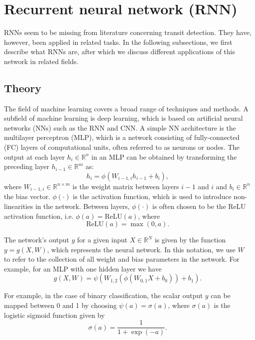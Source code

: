 
\section{Recurrent neural network (RNN)}
\label{sec:rnn}

RNNs seem to be missing from literature concerning transit detection. They have, however, been applied in related tasks. In the following subsections, we first describe what RNNs are, after which we discuss different applications of this network in related fields.

\subsection{Theory}

\noindent The field of machine learning covers a broad range of techniques and methods. A subfield of machine learning is deep learning, which is based on artificial neural networks (NNs) such as the RNN and CNN. A simple NN architecture is the multilayer perceptron (MLP), which is a network consisting of fully-connected (FC) layers of computational units, often referred to as neurons or nodes. The output at each layer $h_{i} \in \mathbb{R}^{n}$ in an MLP can be obtained by transforming the preceding layer $h_{i-1} \in \mathbb{R}^{m}$ as:
\begin{equation}
    h_{i} = \phi(W_{i-1,i} h_{i-1} + b_{i}),
\end{equation}
where $W_{i-1,i} \in \mathbb{R}^{n \times m}$ is the weight matrix between layers $i-1$ and $i$ and $b_{i} \in \mathbb{R}^n$ the bias vector. $\phi(\cdot)$ is the activation function, which is used to introduce non-linearities in the network. Between layers, $\phi(\cdot)$ is often chosen to be the ReLU activation function, i.e. $\phi(a) = \text{ReLU}(a)$, where
\begin{equation}
    \text{ReLU}(a) = \max (0, a).
\end{equation}

The network's output $y$ for a given input $X \in \mathbb{R}^N$ is given by the function $y = g(X, W)$, which represents the neural network. In this notation, we use $W$ to refer to the collection of all weight and bias parameters in the network. For example, for an MLP with one hidden layer we have  
\begin{equation}
    \label{eq:mlp_function}
    g(X, W) = \psi(W_{1,2} (\phi(W_{0,1} X + b_{0})) + b_{1}).
\end{equation}

\noindent For example, in the case of binary classification, the scalar output $y$ can be mapped between 0 and 1 by choosing 
$\psi(a) = \sigma(a)$, where $\sigma(a)$ is the logistic sigmoid function given by
\begin{equation}
    \sigma(a) = \frac{1}{1+\exp(-a)}.
\end{equation}

